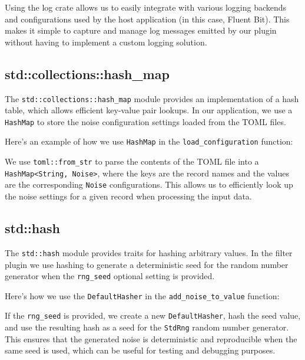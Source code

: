 Using the log crate allows us to easily integrate with various logging backends and configurations used by the host application (in this case, Fluent Bit). This makes it simple to capture and manage log messages emitted by our plugin without having to implement a custom logging solution.

\subsection{std::collections::hash\_map}
The \texttt{std::collections::hash\_map} module provides an implementation of a hash table, which allows efficient key-value pair lookups. In our application, we use a \texttt{HashMap} to store the noise configuration settings loaded from the TOML files.

Here's an example of how we use \texttt{HashMap} in the \texttt{load\_configuration} function:



We use \texttt{toml::from\_str} to parse the contents of the TOML file into a \texttt{HashMap<String, Noise>}, where the keys are the record names and the values are the corresponding \texttt{Noise} configurations. This allows us to efficiently look up the noise settings for a given record when processing the input data.

\subsection{std::hash}
The \texttt{std::hash} module provides traits for hashing arbitrary values. In the filter plugin we use hashing to generate a deterministic seed for the random number generator when the \texttt{rng\_seed} optional setting is provided.

Here's how we use the \lstinline|DefaultHasher| in the \texttt{add\_noise\_to\_value} function:



If the \texttt{rng\_seed} is provided, we create a new \texttt{DefaultHasher}, hash the seed value, and use the resulting hash as a seed for the \texttt{StdRng} random number generator. This ensures that the generated noise is deterministic and reproducible when the same seed is used, which can be useful for testing and debugging purposes.

